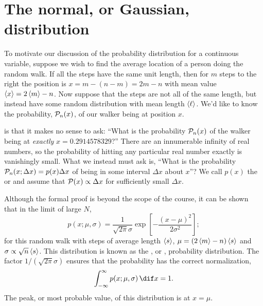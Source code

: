 \section{The normal, or Gaussian, distribution}

To motivate our discussion of the probability distribution for a continuous variable, suppose we wish to find the average location of a person doing the random walk.  If all the steps have the same unit length, then for $m$ steps to the right the position is $x = m - (n-m) = 2m-n$ with mean value $\left\langle x\right\rangle = 2\left\langle m\right\rangle-n$.  Now suppose that the steps are not all of the same length, but instead have some random distribution with mean length $\left\langle\ell\right\rangle$. We'd like to know the probability, $\mathcal{P}_{n}(x)$, of our walker being at  position $x$.

 is that it makes no sense to ask: ``What is the probability $\mathcal{P}_{n}(x)$ of the walker being at \emph{exactly} $x=0.2914578329$?'' There are an innumerable infinity of real numbers, so the probability of hitting any particular real number exactly is vanishingly small.  What we instead must ask is, ``What is the probability $\mathcal{P}_{n}(x;\Delta x) = p(x)\Delta x$ of being in some interval $\Delta x$ about $x$''?  We call $p(x)$ the  or  and assume that $\mathcal{P}(x) \propto \Delta x$ for sufficiently small $\Delta x$.

Although the formal proof is beyond the scope of the course, it can be shown that in the limit of large $N$,
\begin{equation}\label{e.gaussian}
p(x; \mu,\sigma) = \frac{1}{\sqrt{2\pi}\sigma} \exp\left[-\frac{\left(x-\mu\right)^{2}}{2\sigma^{2}}\right];
\end{equation}
for this random walk with steps of average length $\left\langle s\right\rangle$, $\mu = (2\left\langle m\right\rangle-n)\left\langle s\right\rangle$ and $\sigma  \propto \sqrt{n}\left\langle s\right\rangle$.  This distribution is known as the , or , probability distribution.  The factor $1/(\sqrt{2\pi}\sigma)$ ensures that the probability has the correct normalization,
\[ \int_{-\infty}^{\infty}p(x;\mu,\sigma)\,\dif x = 1. \]
The peak, or most probable value, of this distribution is at $x=\mu$.

